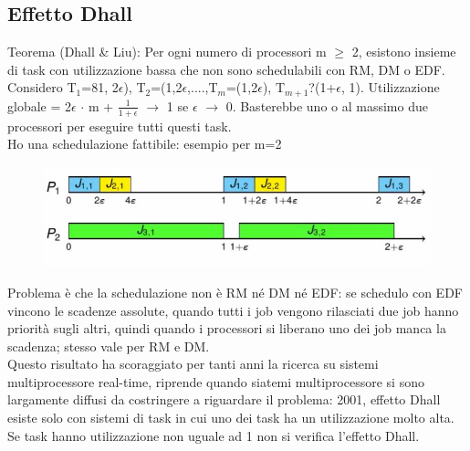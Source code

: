 \documentclass[12pt, oneside]{extbook}
\begin{document}
\subsection{Effetto Dhall}
Teorema (Dhall \& Liu): Per ogni numero di processori m $\geq$ 2, esistono insieme di task con utilizzazione bassa che non sono schedulabili con RM, DM o EDF.\\ Considero T$_{1}$=81, 2$\epsilon$), T$_{2}$=(1,2$\epsilon$,....,T$_{m}$=(1,2$\epsilon$), T$_{m+1}$?(1+$\epsilon$, 1). Utilizzazione globale = 2$\epsilon$ $\cdot$ m + $\frac{1}{1+ \epsilon}$ $\rightarrow$ 1 se $\epsilon$ $\rightarrow$ 0. Basterebbe uno o al massimo due processori per eseguire tutti questi task.\\ Ho una schedulazione fattibile: esempio per m=2\\
\begin{figure}[!h]
\centering
\includegraphics[scale=0.4]{immagini/image-038.jpg}
\end{figure}
Problema è che la schedulazione non è RM né DM né EDF: se schedulo con EDF vincono le scadenze assolute, quando tutti i job vengono rilasciati due job hanno priorità sugli altri, quindi quando i processori si liberano uno dei job manca la scadenza; stesso vale per RM e DM.\\ Questo risultato ha scoraggiato per tanti anni la ricerca su sistemi multiprocessore real-time, riprende quando siatemi multiprocessore si sono largamente diffusi da costringere a riguardare il problema: 2001, effetto Dhall esiste solo con sistemi di task in cui uno dei task ha un utilizzazione molto alta. Se task hanno utilizzazione non uguale ad 1 non si verifica l'effetto Dhall.
\end{document}
